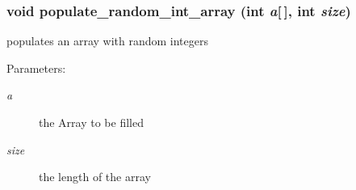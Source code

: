 \subsubsection{\setlength{\rightskip}{0pt plus 5cm}void populate\_\-random\_\-int\_\-array (int {\em a}[$\,$], int {\em size})}\label{sort_8h_72431984f0a72adacd12dae0d0ff3b1e}


populates an array with random integers \begin{Desc}
\item[Parameters:]
\begin{description}
\item[{\em a}]the Array to be filled \item[{\em size}]the length of the array \end{description}
\end{Desc}
